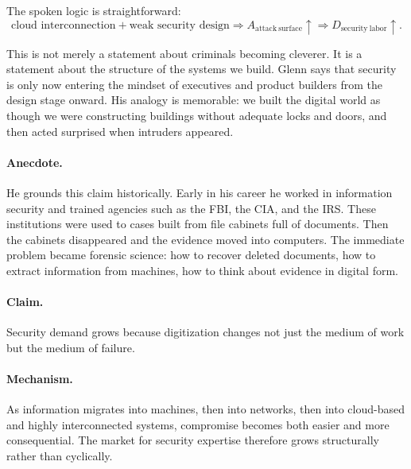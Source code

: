 The spoken logic is straightforward:
\begin{equation}
\text{cloud interconnection} + \text{weak security design}
\Longrightarrow A_{\mathrm{attack\ surface}}\uparrow
\Longrightarrow D_{\mathrm{security\ labor}}\uparrow.
\end{equation}

This is not merely a statement about criminals becoming cleverer. It is a statement about the structure of the systems we build. Glenn says that security is only now entering the mindset of executives and product builders from the design stage onward. His analogy is memorable: we built the digital world as though we were constructing buildings without adequate locks and doors, and then acted surprised when intruders appeared.

\paragraph{Anecdote.} He grounds this claim historically. Early in his career he worked in information security and trained agencies such as the FBI, the CIA, and the IRS. These institutions were used to cases built from file cabinets full of documents. Then the cabinets disappeared and the evidence moved into computers. The immediate problem became forensic science: how to recover deleted documents, how to extract information from machines, how to think about evidence in digital form.

\paragraph{Claim.} Security demand grows because digitization changes not just the medium of work but the medium of failure.

\paragraph{Mechanism.} As information migrates into machines, then into networks, then into cloud-based and highly interconnected systems, compromise becomes both easier and more consequential. The market for security expertise therefore grows structurally rather than cyclically.

